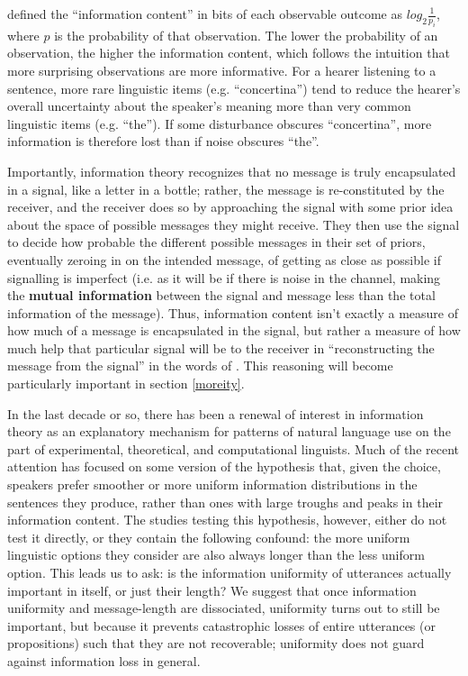 \documentclass[12pt]{article}
\begin{document}
\citet{shannon1948} defined the ``information content'' in bits of each observable outcome as $log_2 \frac{1}{p_i}$, where $p$ is the probability of that observation. The lower the probability of an observation, the higher the information content, which follows the intuition that more surprising observations are more informative. For a hearer listening to a sentence, more rare linguistic items (e.g. ``concertina'') tend to reduce the hearer's overall uncertainty about the speaker's meaning more than very common linguistic items (e.g. ``the''). If some disturbance obscures ``concertina'', more information is therefore lost than if noise obscures ``the''.




Importantly, information theory recognizes that no message is truly encapsulated in a signal, like a letter in a bottle; rather, the message is re-constituted by the receiver, and the receiver does so by approaching the signal with some prior idea about the space of possible messages they might receive. They then use the signal to decide how probable the different possible messages in their set of priors, eventually zeroing in on the intended message, of getting as close as possible if signalling is imperfect (i.e. as it will be if there is noise in the channel, making the \textbf{mutual information} between the signal and message less than the total information of the message). Thus, information content isn't exactly a measure of how much of a message is encapsulated in the signal, but rather a measure of how much help that particular signal will be to the receiver in ``reconstructing the message from the signal'' in the words of \citet{shannon1948}. This reasoning will become particularly important in section \ref{moreity}.

In the last decade or so, there has been a renewal of interest in information theory as an explanatory mechanism for patterns of natural language use on the part of experimental, theoretical, and computational linguists. Much of the recent attention has focused on some version of the hypothesis that, given the choice, speakers prefer smoother or more uniform information distributions in the sentences they produce, rather than ones with large troughs and peaks in their information content. The studies testing this hypothesis, however, either do not test it directly, or they contain the following confound: the more uniform linguistic options they consider are also always longer than the less uniform option. This leads us to ask: is the information uniformity of utterances actually important in itself, or just their length? We suggest that once information uniformity and message-length are dissociated, uniformity turns out to still be important, but because it prevents catastrophic losses of entire utterances (or propositions) such that they are not recoverable; uniformity does not guard against information loss in general. 
 
\end{document}
